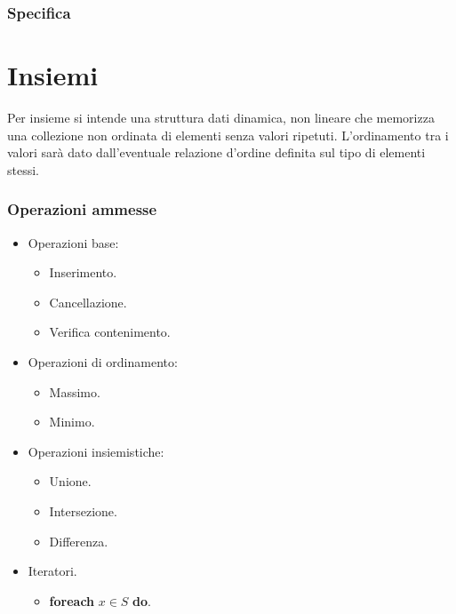 \subsubsection{Specifica}

\newpage
\section{Insiemi}
Per insieme si intende una struttura dati dinamica, non lineare che memorizza una collezione non ordinata di elementi senza valori ripetuti. L'ordinamento
tra i valori sar\`a dato dall'eventuale relazione d'ordine definita sul tipo di elementi stessi.
\subsubsection{Operazioni ammesse}
\begin{multicols}{2}
    \begin{itemize}
        \item Operazioni base:
              \begin{itemize}
                  \item Inserimento.
                  \item Cancellazione.
                  \item Verifica contenimento.
              \end{itemize}
        \item Operazioni di ordinamento:
              \begin{itemize}
                  \item Massimo.
                  \item Minimo.
              \end{itemize}
        \item Operazioni insiemistiche:
              \begin{itemize}
                  \item Unione.
                  \item Intersezione.
                  \item Differenza.
              \end{itemize}
        \item Iteratori.
              \begin{itemize}
                  \item \textbf{foreach} $x\in S$ \textbf{do}.
              \end{itemize}
    \end{itemize}
\end{multicols}
